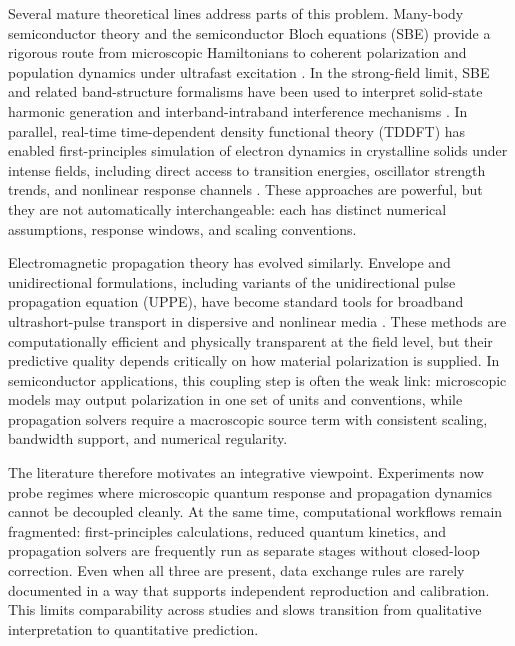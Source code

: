 \documentclass[aps,pra,twocolumn,reprint,superscriptaddress,nofootinbib]{revtex4-2}
\begin{document}
Several mature theoretical lines address parts of this problem. Many-body
semiconductor theory and the semiconductor Bloch equations (SBE) provide a
rigorous route from microscopic Hamiltonians to coherent polarization and
population dynamics under ultrafast excitation
\cite{rossi2002ultrafast,axt2004femtosecond}. In the strong-field limit, SBE
and related band-structure formalisms have been used to interpret solid-state
harmonic generation and interband-intraband interference mechanisms
\cite{golde2008hhg,vampa2014theoretical,vampa2015semiclassical,tancogne2017ellipticity}. In parallel,
real-time time-dependent density functional theory (TDDFT) has enabled
first-principles simulation of electron dynamics in crystalline solids under
intense fields, including direct access to transition energies, oscillator
strength trends, and nonlinear response channels
\cite{hohenberg1964inhomogeneous,kohn1965selfconsistent,runge1984densityfunctional,yabana2012tddft,floss2018abinitio}. These approaches are powerful, but
they are not automatically interchangeable: each has distinct numerical
assumptions, response windows, and scaling conventions.

Electromagnetic propagation theory has evolved similarly. Envelope and
unidirectional formulations, including variants of the unidirectional pulse
propagation equation (UPPE), have become standard tools for broadband
ultrashort-pulse transport in dispersive and nonlinear media
\cite{brabec1997nonlinear,kolesik2002nonlinear,kolesik2004unidirectional}.
These methods are computationally efficient and physically transparent at the
field level, but their predictive quality depends critically on how material
polarization is supplied. In semiconductor applications, this coupling step is
often the weak link: microscopic models may output polarization in one set of
units and conventions, while propagation solvers require a macroscopic source
term with consistent scaling, bandwidth support, and numerical regularity.

The literature therefore motivates an integrative viewpoint. Experiments now
probe regimes where microscopic quantum response and propagation dynamics cannot
be decoupled cleanly. At the same time, computational workflows remain fragmented:
first-principles calculations, reduced quantum kinetics, and propagation solvers
are frequently run as separate stages without closed-loop correction. Even when
all three are present, data exchange rules are rarely documented in a way that
supports independent reproduction and calibration. This limits comparability
across studies and slows transition from qualitative interpretation to
quantitative prediction.
\end{document}
